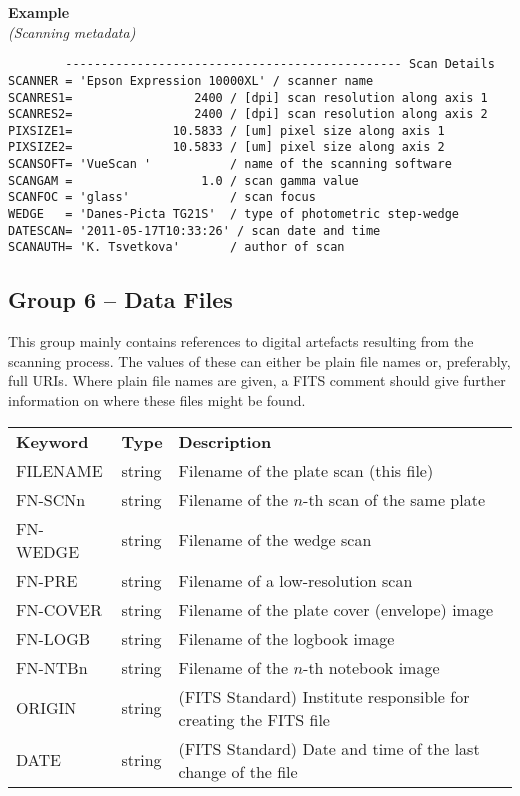 \documentclass[11pt]{ivoa}
\newenvironment{fitsexample}[1]
{\bigskip\noindent\textbf{Example}\\\textit{(#1\smallskip)}}
{\medskip}
\begin{document}
\begin{fitsexample}{Scanning metadata}
\begin{lstlisting}
        ----------------------------------------------- Scan Details
SCANNER = 'Epson Expression 10000XL' / scanner name
SCANRES1=                 2400 / [dpi] scan resolution along axis 1
SCANRES2=                 2400 / [dpi] scan resolution along axis 2
PIXSIZE1=              10.5833 / [um] pixel size along axis 1
PIXSIZE2=              10.5833 / [um] pixel size along axis 2
SCANSOFT= 'VueScan '           / name of the scanning software
SCANGAM =                  1.0 / scan gamma value
SCANFOC = 'glass'              / scan focus
WEDGE   = 'Danes-Picta TG21S'  / type of photometric step-wedge
DATESCAN= '2011-05-17T10:33:26' / scan date and time
SCANAUTH= 'K. Tsvetkova'       / author of scan
\end{lstlisting}
\end{fitsexample}


\subsection{Group 6 – Data Files}

This group mainly contains references to digital artefacts resulting
from the scanning process.  The values of these can either be plain file
names or, preferably, full URIs.  Where plain file names are given, a
FITS comment should give further information on where these files might
be found.

\begin{inlinetable}
\footnotesize
\begin{tabular}{llp{}}
\sptablerule
\textbf{Keyword}&\textbf{Type}&\textbf{Description}\\
\sptablerule
FILENAME &string    &Filename of the plate scan (this file)\\
FN-SCNn  &string    &
  Filename of the $n$-th scan of the same plate\\
FN-WEDGE &string    &Filename of the wedge scan\\
FN-PRE   &string    &
  Filename of a low-resolution scan\\
FN-COVER &string    &
  Filename of the plate cover (envelope) image\\
FN-LOGB  &string    &Filename of the logbook image\\
FN-NTBn  &string    &
  Filename of the $n$-th notebook image\\
ORIGIN   &string    &
  (FITS Standard) Institute responsible for creating the FITS file\\
DATE     &string    &
  (FITS Standard) Date and time of the last change of the file \\
\end{tabular}
\end{inlinetable}
\end{document}
